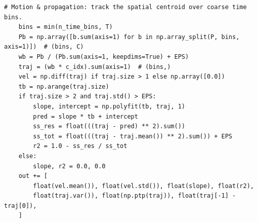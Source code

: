 \begin{lstlisting}[style=dasfe, firstnumber=171, caption={Motion and propagation descriptors in \texttt{dasfe/features\_spatial.py}, lines 171--189 (Equation~(\ref{eq:trajectory})).}, label={lst:trajectory}]
    # Motion & propagation: track the spatial centroid over coarse time bins.
    bins = min(n_time_bins, T)
    Pb = np.array([b.sum(axis=1) for b in np.array_split(P, bins, axis=1)])  # (bins, C)
    wb = Pb / (Pb.sum(axis=1, keepdims=True) + EPS)
    traj = (wb * c_idx).sum(axis=1)  # (bins,)
    vel = np.diff(traj) if traj.size > 1 else np.array([0.0])
    tb = np.arange(traj.size)
    if traj.size > 2 and traj.std() > EPS:
        slope, intercept = np.polyfit(tb, traj, 1)
        pred = slope * tb + intercept
        ss_res = float(((traj - pred) ** 2).sum())
        ss_tot = float(((traj - traj.mean()) ** 2).sum()) + EPS
        r2 = 1.0 - ss_res / ss_tot
    else:
        slope, r2 = 0.0, 0.0
    out += [
        float(vel.mean()), float(vel.std()), float(slope), float(r2),
        float(traj.var()), float(np.ptp(traj)), float(traj[-1] - traj[0]),
    ]
\end{lstlisting}

